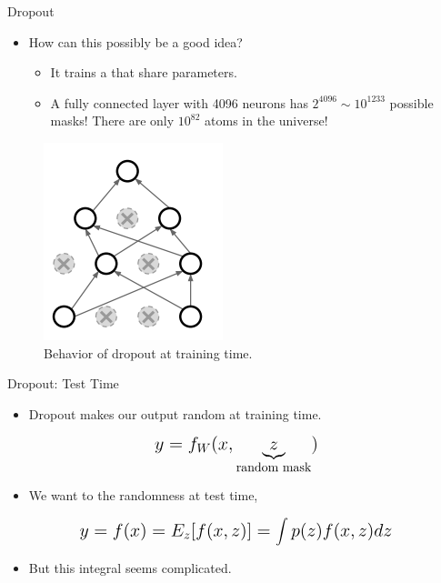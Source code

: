 \begin{frame}{Dropout}
	\begin{itemize}
		\item How can this possibly be a good idea?
		\medskip
		\begin{itemize}
			\item It trains a  that share parameters.
			\medskip
			\item A fully connected layer with 4096 neurons has $2^4096 \sim 10^1233$ possible masks! There are only $10^82$ atoms in the universe!
		\end{itemize}
	\end{itemize}
	\begin{figure}[H]
		\centering
		\includegraphics[height=0.4\textheight]{Figs/section_4/dropout_why2.png}
		\caption{Behavior of dropout at training time. \cite{cs231n-2018-lecture7}}
	\end{figure}
\end{frame}
\begin{frame}{Dropout: Test Time}
	\begin{itemize}
		\item Dropout makes our output random at training time.
		\medskip
	\end{itemize}
	\begin{equation*}
		\mathlarger{\mathlarger{
		y = f_W(x, \underbrace{z}_{\text{random mask}})
	}}
	\end{equation*}
	\begin{itemize}
		\item We want to  the randomness at test time,
		\medskip
	\end{itemize}
	\begin{equation*}
		\mathlarger{\mathlarger{
			y = f(x) = E_z[f(x, z)] = \int p(z)f(x, z) dz
		}}
	\end{equation*}
	\begin{itemize}
		\item But this integral seems complicated.
	\end{itemize}
\end{frame}
